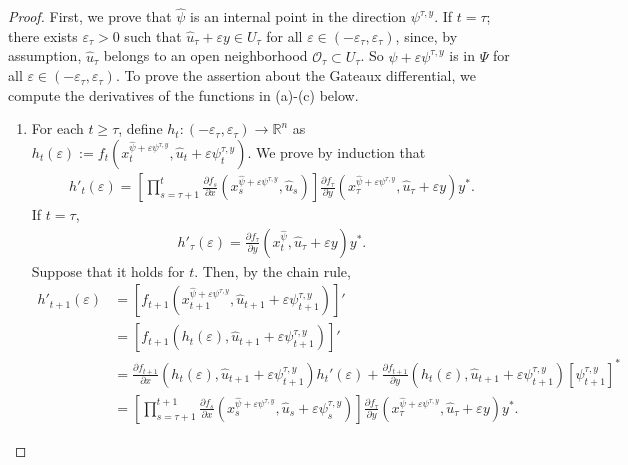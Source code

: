 \documentclass[3p]{elsarticle}
\newcommand{\rzn}{\mathbb R^{n}}
\begin{document}
	\begin{proof}
		First, we prove that $\hat\psi$ is an internal point in the direction $\psi^{\tau,y}$.
		If $t=\tau$; there exists $\varepsilon_\tau>0$ such that $\hat u_\tau+\varepsilon y\in U_\tau$ for all $\varepsilon\in(-\varepsilon_\tau,\varepsilon_\tau)$, since, by assumption, $\hat u_\tau$ belongs to an open neighborhood $\mathcal O_\tau\subset U_\tau$.  So  $\hat\psi+\varepsilon\psi^{\tau,y}$ is in $\Psi$ for all $\varepsilon\in(-\varepsilon_\tau,\varepsilon_\tau)$. To prove the assertion about the Gateaux differential, we compute the derivatives of the functions in (a)-(c) below.
		\begin{enumerate}
			\item[(a)] For each $t\ge\tau$, define $h_t:(-\varepsilon_\tau,\varepsilon_\tau)\to \rzn$ as $h_t(\varepsilon):=f_t(x_t^{\hat{\psi}+\varepsilon\psi^{\tau,y}},\hat u_t+\varepsilon\psi_t^{\tau,y})$.
			We prove by induction that
			\begin{align*}
			h'_t(\varepsilon)=\displaystyle\left[ \prod_{s=\tau+1}^t\frac{\partial f_s}{\partial x}(x_s^{\hat{\psi}+\varepsilon\psi^{\tau,y}},\hat u_s)\right] \frac{\partial f_\tau}{\partial y}(x_\tau^{\hat{\psi}+\varepsilon\psi^{\tau,y}},\hat u_\tau+\varepsilon y)y^*.
			\end{align*}
			If $t=\tau$,
			\begin{align*}
			h'_{\tau}(\varepsilon)=\frac{\partial f_{\tau}}{\partial y}(x_t^{\hat\psi},\hat u_{\tau}+\varepsilon y)y^*.
			\end{align*}
			Suppose that it holds for $t$. Then, by the chain rule,
			\begin{align*}
			h'_{t+1}(\varepsilon)&=[ f_{t+1}(x_{t+1}^{\hat{\psi}+\varepsilon\psi^{\tau,y}},\hat u_{t+1}+\varepsilon\psi^{\tau,y}_{t+1})]'\\
			&=\left[ f_{t+1}(h_t(\varepsilon),\hat u_{t+1}+\varepsilon\psi^{\tau,y}_{t+1})\right]'\\
			&=\frac{\partial f_{t+1}}{\partial x}(h_t(\varepsilon),\hat u_{t+1}+\varepsilon\psi^{\tau,y}_{t+1})h_t'(\varepsilon)+\frac{\partial f_{t+1}}{\partial y}(h_t(\varepsilon),\hat u_{t+1}+\varepsilon\psi^{\tau,y}_{t+1})[\psi^{\tau,y}_{t+1}]^*\\
			&=\displaystyle\left[ \prod_{s=\tau+1}^{t+1}\frac{\partial f_s}{\partial x}(x_s^{\hat{\psi}+\varepsilon\psi^{\tau,y}},\hat u_s+\varepsilon\psi^{\tau,y}_s)\right] \frac{\partial f_{\tau}}{\partial y}(x_\tau^{\hat{\psi}+\varepsilon\psi^{\tau,y}},\hat u_\tau+\varepsilon y)y^*.
			\end{align*}

\end{enumerate}
\end{proof}
\end{document}
